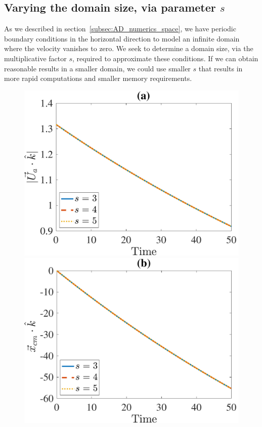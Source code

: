 \subsection{Varying the domain size, via parameter $s$}
As we described in section~\ref{subsec:AD_numerics_space}, we have periodic boundary conditions in the horizontal direction to model an infinite domain where the velocity vanishes to zero. 
We seek to determine a domain size, via the multiplicative factor $s$, required to approximate these conditions.
If we can obtain reasonable results in a smaller domain, we could use smaller $s$ that results in more rapid computations and smaller memory requirements. 
\begin{figure}[ht]
	\begin{center}
		\includegraphics[scale=0.35]{./figures/fig_NC10_s_Ua3_all}
		\includegraphics[scale=0.35]{./figures/fig_NC10_s_cm3_all}

\end{center}
\end{figure}
